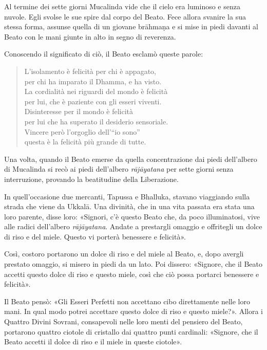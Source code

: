 Al termine dei sette giorni Mucalinda vide che il cielo era luminoso e senza
nuvole. Egli svolse le sue spire dal corpo del Beato. Fece allora svanire la sua
stessa forma, assunse quella di un giovane brāhmaṇa e si mise in piedi davanti
al Beato con le mani giunte in alto in segno di reverenza.

Conoscendo il significato di ciò, il Beato esclamò queste parole:

\begin{quote}
L’isolamento è felicità per chi è appagato, \\
per chi ha imparato il Dhamma, e ha visto. \\
La cordialità nei riguardi del mondo è felicità \\
per lui, che è paziente con gli esseri viventi. \\
Disinteresse per il mondo è felicità \\
per lui che ha superato il desiderio sensoriale. \\
Vincere però l’orgoglio dell’“io sono” \\
questa è la felicità più grande di tutte.
\end{quote}


Una volta, quando il Beato emerse da quella concentrazione dai piedi dell’albero
di Mucalinda si recò ai piedi dell’albero \emph{rājāyatana} per sette giorni
senza interruzione, provando la beatitudine della Liberazione.

\label{pag41}In quell’occasione due mercanti, Tapussa e Bhalluka, stavano
viaggiando sulla strada che viene da Ukkalā. Una divinità, che in una vita
passata era stata una loro parente, disse loro: «Signori, c’è questo Beato che,
da poco illuminatosi, vive alle radici dell’albero \emph{rājāyatana}. Andate a
prestargli omaggio e offritegli un dolce di riso e del miele. Questo vi porterà
benessere e felicità».

Così, costoro portarono un dolce di riso e del miele al Beato, e, dopo avergli
prestato omaggio, si misero in piedi da un lato. Poi dissero: «Signore, che il
Beato accetti questo dolce di riso e questo miele, così che ciò possa portarci
benessere e felicità».

Il Beato pensò: «Gli Esseri Perfetti non accettano cibo direttamente nelle loro
mani. In qual modo potrei accettare questo dolce di riso e questo miele?».
Allora i Quattro Divini Sovrani, consapevoli nelle loro menti del pensiero del
Beato, portarono quattro ciotole di cristallo dai quattro punti cardinali:
«Signore, che il Beato accetti il dolce di riso e il miele in queste ciotole».

